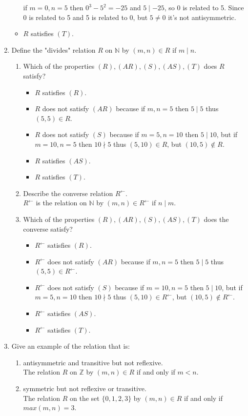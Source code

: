 \documentclass{article}
\newcommand{\N}{\mathbb{N}}
\newcommand{\Z}{\mathbb{Z}}
\begin{document}
\begin{enumerate}
\begin{itemize}
	if $m=0,n=5$ then $0^3-5^2=-25$ and $5\mid-25$, so 0 is related to 5. Since 0 is related to 5 and 5 is 
	related to 0, but $5\not=0$ it's not antisymmetric.
	\item $R$ satisfies $(T)$. 
	\end{itemize}
\item Define the "divides" relation $R$ on $\N$ by $(m,n)\in R$ if $m\mid n$.
	\begin{enumerate}
	\item Which of the properties $(R),(AR),(S),(AS),(T)$ does $R$ satisfy?\\
		\begin{itemize}
		\item $R$ satisfies $(R)$.
		\item $R$ does not satisfy $(AR)$ because if $m,n=5$ then $5\mid5$ thus $(5,5)\in R$.
		\item $R$ does not satisfy $(S)$ because if $m=5,n=10$ then $5\mid10$, but if $m=10,n=5$ then $10\nmid5$ thus 
		$(5,10)\in R$, but $(10,5)\not\in R$.
		\item $R$ satisfies $(AS)$.
		\item $R$ satisfies $(T)$.
		\end{itemize}
	\item Describe the converse relation $R^\gets$.\\
	$R^\gets$ is the relation on $\N$ by $(m,n)\in R^\gets$ if $n\mid m$.
	\item Which of the properties $(R),(AR),(S),(AS),(T)$ does the converse satisfy?
		\begin{itemize}
		\item $R^\gets$ satisfies $(R)$.
		\item $R^\gets$ does not satisfy $(AR)$ because if $m,n=5$ then $5\mid5$ thus \\$(5,5)\in 
		R^\gets$.
		\item $R^\gets$ does not satisfy $(S)$ because if $m=10,n=5$ then $5\mid10$, 
		but if $m=5,n=10$ then $10\nmid5$ thus $(5,10)\in R^\gets$, but $(10,5)\not\in R^\gets$.
		\item $R^\gets$ satisfies $(AS)$.
		\item $R^\gets$ satisfies $(T)$.
		\end{itemize}
	\end{enumerate}
\setcounter{enumi}{9}
\item Give an example of the relation that is:
	\begin{enumerate}
	\item antisymmetric and transitive but not reflexive.\\
	The relation $R$ on $\Z$ by $(m,n)\in R$ if and only if $m<n$.
	\item symmetric but not reflexive or transitive.\\
	The relation $R$ on the set $\{0,1,2,3\}$ by $(m,n)\in R$ if and only if $max(m,n)=3$.
	\end{enumerate}
\end{enumerate}
\end{document}

